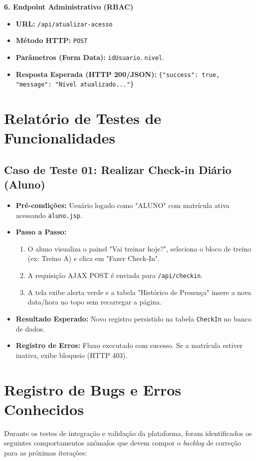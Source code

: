 \documentclass[12pt, a4paper]{article}
\begin{document}
\vspace{0.3cm}
\noindent\textbf{6. Endpoint Administrativo (RBAC)}
\begin{itemize}
    \item \textbf{URL:} \texttt{/api/atualizar-acesso}
    \item \textbf{Método HTTP:} \texttt{POST}
    \item \textbf{Parâmetros (Form Data):} \texttt{idUsuario}, \texttt{nivel}.
    \item \textbf{Resposta Esperada (HTTP 200/JSON):} \texttt{\{"success": true, "message": "Nível atualizado..."\}}
\end{itemize}

\section{Relatório de Testes de Funcionalidades}
\subsection{Caso de Teste 01: Realizar Check-in Diário (Aluno)}
\begin{itemize}
    \item \textbf{Pré-condições:} Usuário logado como "ALUNO" com matrícula ativa acessando \texttt{aluno.jsp}.
    \item \textbf{Passo a Passo:}
    \begin{enumerate}
        \item O aluno visualiza o painel "Vai treinar hoje?", seleciona o bloco de treino (ex: Treino A) e clica em "Fazer Check-In".
        \item A requisição AJAX POST é enviada para \texttt{/api/checkin}.
        \item A tela exibe alerta verde e a tabela "Histórico de Presença" insere a nova data/hora no topo sem recarregar a página.
    \end{enumerate}
    \item \textbf{Resultado Esperado:} Novo registro persistido na tabela \texttt{CheckIn} no banco de dados.
    \item \textbf{Registro de Erros:} Fluxo executado com sucesso. Se a matrícula estiver inativa, exibe bloqueio (HTTP 403).
\end{itemize}

\section{Registro de Bugs e Erros Conhecidos}
Durante os testes de integração e validação da plataforma, foram identificados os seguintes comportamentos anômalos que devem compor o \textit{backlog} de correção para as próximas iterações:
\end{document}
